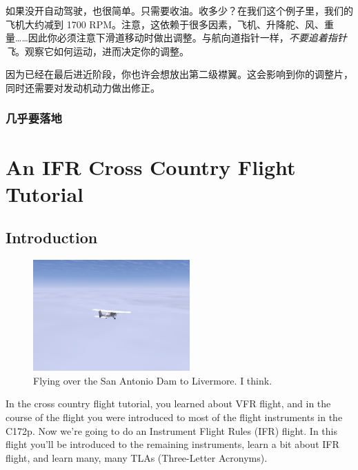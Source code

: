 如果没开自动驾驶，也很简单。只需要收油。收多少？在我们这个例子里，我们的飞机大约减到 1700 RPM。注意，这依赖于很多因素，飞机、升降舵、风、重量……因此你必须注意下滑道移动时做出调整。与航向道指针一样，\emph{不要追着指针飞}。观察它如何运动，进而决定你的调整。

因为已经在最后进近阶段，你也许会想放出第二级襟翼。这会影响到你的调整片，同时还需要对发动机动力做出修正。

\subsection{几乎要落地}



\fi
\iffalse
\chapter{An IFR Cross Country Flight Tutorial}
\label{IFR Tutorial}

\section{Introduction}

\begin{figure}[h]
  \begin{center}
    \includegraphics[width=6cm]{img/somewhere}
    \caption{Flying over the San Antonio Dam to Livermore.  I think.}
    \label{fig:somewhere}
  \end{center}
\end{figure}

In the cross country flight tutorial, you learned about VFR flight,
and in the course of the flight you were introduced to most of the
flight instruments in the C172p.  Now we're going to do an Instrument
Flight Rules (IFR) flight.  In this flight you'll be introduced to the
remaining instruments, learn a bit about IFR flight, and learn many,
many TLAs (Three-Letter Acronyms).

